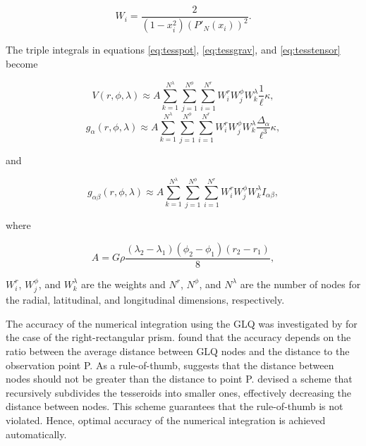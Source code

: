 \documentclass[extra]{gji}
\begin{document}
\begin{equation}
    W_i = \frac{2}{(1 - x_i^2)(P'_N(x_i))^2}.
\end{equation}

The triple integrals in equations
\ref{eq:tesspot},
\ref{eq:tessgrav},
and
\ref{eq:tesstensor}
become

\begin{equation}
    V(r,\phi,\lambda) \approx
        A
        \sum\limits_{k=1}^{N^{\lambda}}
        \sum\limits_{j=1}^{N^{\phi}}
        \sum\limits_{i=1}^{N^r}
        W^r_i W^{\phi}_j W^{\lambda}_k
        \frac{1}{\ell} \kappa,
\end{equation}
\begin{equation}
    g_{\alpha}(r,\phi,\lambda) \approx
        A
        \sum\limits_{k=1}^{N^{\lambda}}
        \sum\limits_{j=1}^{N^{\phi}}
        \sum\limits_{i=1}^{N^r}
        W^r_i W^{\phi}_j W^{\lambda}_k
        \frac{\Delta_{\alpha}}{\ell^3} \kappa,
\end{equation}

\noindent
and

\begin{equation}
    g_{\alpha\beta}(r,\phi,\lambda) \approx
        A
        \sum\limits_{k=1}^{N^{\lambda}}
        \sum\limits_{j=1}^{N^{\phi}}
        \sum\limits_{i=1}^{N^r}
        W^r_i W^{\phi}_j W^{\lambda}_k
        I_{\alpha\beta},
\end{equation}

\noindent
where

\begin{equation}
    A = G \rho
    \frac{(\lambda_2 - \lambda_1)(\phi_2 - \phi_1)(r_2 - r_1)}{8},
\end{equation}

\noindent
$W_i^r$, $W_j^{\phi}$, and $W_k^{\lambda}$
are the weights
and $N^r$, $N^{\phi}$, and $N^{\lambda}$
are the number of nodes
for the radial, latitudinal, and longitudinal dimensions, respectively.

The accuracy of the numerical integration
using the GLQ
was investigated by \citet{Ku1977}
for the case of the right-rectangular prism.
\citet{Ku1977} found that the accuracy
depends on the ratio between
the average distance between GLQ nodes
and the distance to the observation point P.
As a rule-of-thumb,
\citet{Ku1977} suggests that
the distance between nodes
should not be greater than
the distance to point P.
\citet{Li2011} devised a scheme that
recursively subdivides the tesseroids
into smaller ones,
effectively decreasing the distance between nodes.
This scheme guarantees that
the rule-of-thumb is not violated.
Hence,
optimal accuracy of the numerical integration
is achieved automatically.
\end{document}
